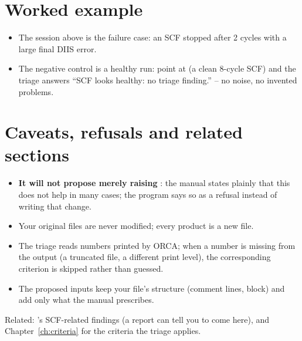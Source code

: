 \section{Worked example}

\begin{itemize}
  \item The session above is the failure case: an SCF stopped after 2 cycles
    with a large final DIIS error.
  \item The negative control is a healthy run: point  at
     (a clean 8-cycle SCF) and the triage answers
    ``SCF looks healthy: no triage finding.'' -- no noise, no invented
    problems.
\end{itemize}

\section{Caveats, refusals and related sections}

\begin{refusalbox}
\begin{itemize}
  \item \textbf{It will not propose merely raising }: the manual
    states plainly that this does not help in many cases; the program says so
    as a refusal instead of writing that change.
  \item Your original files are never modified; every product is a new file.
  \item The triage reads numbers printed by ORCA; when a number is missing
    from the output (a truncated file, a different print level), the
    corresponding criterion is skipped rather than guessed.
  \item The proposed inputs keep your file's structure (comment lines,
     block) and add only what the manual prescribes.
\end{itemize}
\end{refusalbox}

Related: 's SCF-related findings (a report can tell you to come here),
and Chapter~\ref{ch:criteria} for the criteria the triage applies.
